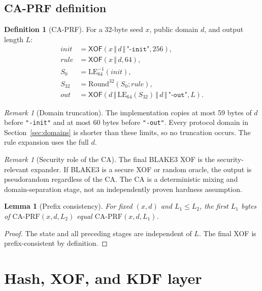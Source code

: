 \documentclass[11pt,a4paper]{article}
\theoremstyle{plain}
\newtheorem{lemma}[theorem]{Lemma}
\theoremstyle{definition}
\newtheorem{definition}[theorem]{Definition}
\theoremstyle{remark}
\newtheorem{remark}[theorem]{Remark}
\newcommand{\concat}{\,\Vert\,}
\newcommand{\XOF}{\mathsf{XOF}}
\begin{document}
\subsection{CA-PRF definition}

\begin{definition}[CA-PRF]
For a 32-byte seed $x$, public domain $d$, and output length $L$:
\[
\begin{aligned}
 \mathit{init} &= \XOF(x\concat d\concat\texttt{"-init"},256),\\
 \mathit{rule} &= \XOF(x\concat d,64),\\
 S_0 &= \mathrm{LE}^{-1}_{64}(\mathit{init}),\\
 S_{32} &= \mathrm{Round}^{32}(S_0;\mathit{rule}),\\
 \mathit{out} &= \XOF(d\concat\mathrm{LE}_{64}(S_{32})
   \concat d\concat\texttt{"-out"},L).
\end{aligned}
\]
\end{definition}

\begin{remark}[Domain truncation]
The implementation copies at most 59 bytes of $d$ before
\texttt{"-init"} and at most 60 bytes before \texttt{"-out"}.  Every
protocol domain in Section~\ref{sec:domains} is shorter than these
limits, so no truncation occurs.  The rule expansion uses the full $d$.
\end{remark}

\begin{remark}[Security role of the CA]
The final BLAKE3 XOF is the security-relevant expander.  If BLAKE3 is a
secure XOF or random oracle, the output is pseudorandom regardless of the
CA.  The CA is a deterministic mixing and domain-separation stage, not
an independently proven hardness assumption.
\end{remark}

\begin{lemma}[Prefix consistency]
\label{lem:caprf-prefix}
For fixed $(x,d)$ and $L_1\le L_2$, the first $L_1$ bytes of
$\mathrm{CA\text{-}PRF}(x,d,L_2)$ equal
$\mathrm{CA\text{-}PRF}(x,d,L_1)$.
\end{lemma}

\begin{proof}
The state and all preceding stages are independent of $L$.  The final
XOF is prefix-consistent by definition.
\end{proof}

\section{Hash, XOF, and KDF layer}
\label{sec:hash}
\end{document}
